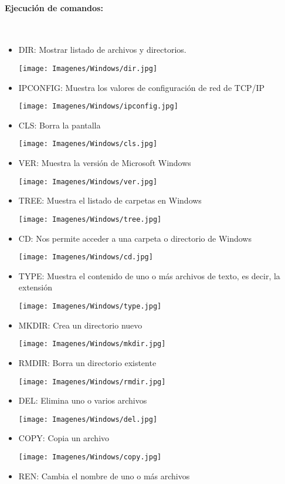 \documentclass[12pt]{article}
\begin{document}
\paragraph{ Ejecución de comandos: }\\
		\begin{itemize}
			\item DIR: Mostrar listado de archivos y directorios.
			
				\texttt{[image: Imagenes/Windows/dir.jpg]}	
			\item IPCONFIG: Muestra los valores de configuración de red de TCP/IP
			
				\texttt{[image: Imagenes/Windows/ipconfig.jpg]}
			\newpage
			\item CLS: Borra la pantalla
			
				\texttt{[image: Imagenes/Windows/cls.jpg]}	
			\item VER: Muestra la versión de Microsoft Windows
			
				\texttt{[image: Imagenes/Windows/ver.jpg]}	
			\item TREE: Muestra el listado de carpetas en Windows
			
				\texttt{[image: Imagenes/Windows/tree.jpg]}\\	
			\item CD: Nos permite acceder a una carpeta o directorio de Windows
			
				\texttt{[image: Imagenes/Windows/cd.jpg]}	
			\item TYPE: Muestra el contenido de uno o más archivos de texto, es decir, la extensión
			
				\texttt{[image: Imagenes/Windows/type.jpg]}
			\newpage
			\item MKDIR:  Crea un directorio nuevo
			
				\texttt{[image: Imagenes/Windows/mkdir.jpg]}	
				
			\item RMDIR: Borra un directorio existente
			
				\texttt{[image: Imagenes/Windows/rmdir.jpg]}	
			\item DEL: Elimina uno o varios archivos
			
				\texttt{[image: Imagenes/Windows/del.jpg]}
			\newpage
			\item COPY: Copia un archivo
			
				\texttt{[image: Imagenes/Windows/copy.jpg]}	
			\item REN: Cambia el nombre de uno o más archivos
			

\end{itemize}
\end{document}
